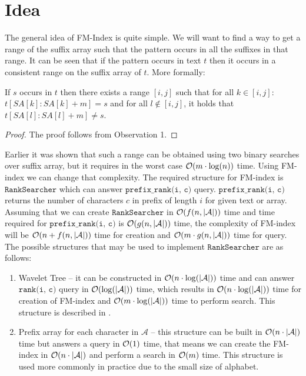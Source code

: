 \section{Idea}

The general idea of FM-Index \cite{FMIndex} is quite simple. We will want to find a way to get a range of the suffix array such that the pattern occurs in all the suffixes in that range. It can be seen that if the pattern occurs in text $t$ then it occurs in a consistent range on the suffix array of $t$. More formally:

\begin{theorem}
    If $s$ occurs in $t$ then there exists a range $[i, j]$ such that for all $k \in [i, j]$: $t[SA[k]: SA[k] + m] = s$ and for all $l \notin [i, j]$, it holds that $t[SA[l]: SA[l] + m] \neq s$.
\end{theorem}

\begin{proof}
    The proof follows from Observation 1.
\end{proof}

Earlier it was shown that such a range can be obtained using two binary searches over suffix array, but it requires in the worst case $\mathcal{O}(m \cdot \log (n))$ time. Using FM-index we can change that complexity. The required structure for FM-index is $\texttt{RankSearcher}$ which can answer $\texttt{prefix\_rank(i, c)}$ query. $\texttt{prefix\_rank(i, c)}$ returns the number of characters $c$ in prefix of length $i$ for given text or array. Assuming that we can create $\texttt{RankSearcher}$ in $\mathcal{O}(f(n, |\mathcal{A}|))$ time and time required for $\texttt{prefix\_rank(i, c)}$ is $\mathcal{O}(g(n, |\mathcal{A}|))$ time, the complexity of FM-index will be $\mathcal{O}(n + f(n, |\mathcal{A}|))$ time for creation and $\mathcal{O}(m\cdot g(n, |\mathcal{A}|))$ time for query. The possible structures that may be used to implement $\texttt{RankSearcher}$ are as follows:

\begin{enumerate}
    \item Wavelet Tree -- it can be constructed in $\mathcal{O}(n\cdot \log(|\mathcal{A}|))$ time and can answer $\texttt{rank(i, c)}$ query in $\mathcal{O}(\log(|\mathcal{A}|))$ time, which results in $\mathcal{O}(n\cdot \log(|\mathcal{A}|))$ time for creation of FM-index and $\mathcal{O}(m\cdot \log(|\mathcal{A}|))$ time to perform search. This structure is described in .
    \item Prefix array for each character in $\mathcal{A}$ -- this structure can be built in $\mathcal{O}(n\cdot |\mathcal{A}|)$ time but answers a query in $\mathcal{O}(1)$ time, that means we can create the FM-index in $\mathcal{O}(n\cdot |\mathcal{A}|)$ and perform a search in $\mathcal{O}(m)$ time. This structure is used more commonly in practice due to the small size of alphabet.
\end{enumerate}


